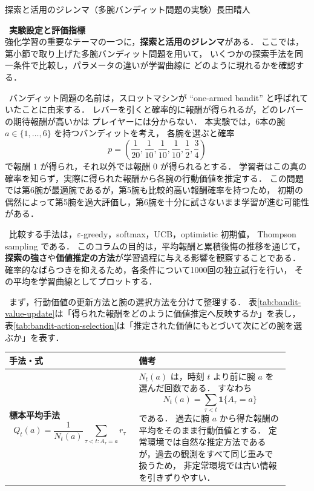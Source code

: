 \clearpage
\begin{column}{探索と活用のジレンマ（多腕バンディット問題の実験）}{長田晴人}

\ \textbf{実験設定と評価指標}\\
強化学習の重要なテーマの一つに，\textbf{探索と活用のジレンマ}がある．
ここでは，第小節で取り上げた多腕バンディット問題を用いて，
いくつかの探索手法を同一条件で比較し，パラメータの違いが学習曲線に
どのように現れるかを確認する．

\ バンディット問題の名前は，スロットマシンが ``one-armed bandit''
と呼ばれていたことに由来する．
レバーを引くと確率的に報酬が得られるが，どのレバーの期待報酬が高いかは
プレイヤーには分からない．
本実験では，6本の腕 $a\in\{1,\ldots,6\}$ を持つバンディットを考え，
各腕を選ぶと確率
\[
    p=\left(\frac{1}{20},\frac{1}{10},\frac{1}{10},\frac{1}{10},\frac{1}{2},\frac{3}{4}\right)
\]
で報酬 $1$ が得られ，それ以外では報酬 $0$ が得られるとする．
学習者はこの真の確率を知らず，実際に得られた報酬から各腕の行動価値を推定する．
この問題では第6腕が最適腕であるが，第5腕も比較的高い報酬確率を持つため，
初期の偶然によって第5腕を過大評価し，第6腕を十分に試さないまま学習が進む可能性がある．

\ 比較する手法は，$\varepsilon$-greedy，softmax，UCB，optimistic 初期値，
Thompson sampling である．
このコラムの目的は，平均報酬と累積後悔の推移を通じて，
\textbf{探索の強さ}や\textbf{価値推定の方法}が学習過程に与える影響を観察することである．
確率的なばらつきを抑えるため，各条件について1000回の独立試行を行い，
その平均を学習曲線としてプロットする．

\ まず，行動価値の更新方法と腕の選択方法を分けて整理する．
表\ref{tab:bandit-value-update}は「得られた報酬をどのように価値推定へ反映するか」を表し，
表\ref{tab:bandit-action-selection}は「推定された価値にもとづいて次にどの腕を選ぶか」を表す．

\begin{center}
    \small
    \renewcommand{\arraystretch}{1.55}
    \label{tab:bandit-value-update}
    \begin{tabular}{p{0.42\linewidth}p{0.50\linewidth}}
      \toprule
      手法・式 & 備考 \\
      \midrule

      \textbf{標本平均手法}
      \[
      Q_t(a)
      =
      \frac{1}{N_t(a)}
      \sum_{\tau < t: A_\tau=a} r_\tau
      \]
      &
      $N_t(a)$ は，時刻 $t$ より前に腕 $a$ を選んだ回数である．
      すなわち
      \[
          N_t(a)=\sum_{\tau<t}\mathbf{1}\{A_\tau=a\}
      \]
      である．
      過去に腕 $a$ から得た報酬の平均をそのまま行動価値とする．
      定常環境では自然な推定方法であるが，過去の観測をすべて同じ重みで扱うため，
      非定常環境では古い情報を引きずりやすい．
      \\


\end{tabular}
\end{center}
\end{column}
